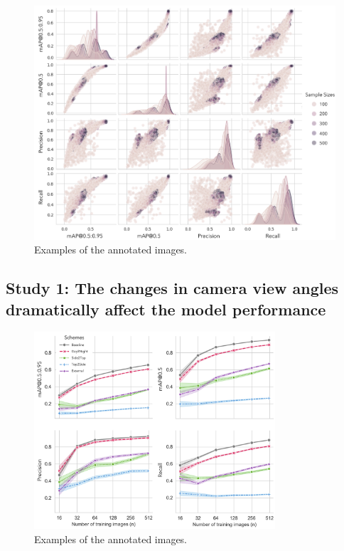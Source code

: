 \begin{figure}[H]
    \centering
    \includegraphics[width=1\textwidth]{figure_s1.jpg}
    \caption{Examples of the annotated images.}
    \label{fig:metrics}
\end{figure}



\subsection*{Study 1: The changes in camera view angles dramatically affect the model performance}


\begin{figure}[H]
    \centering
    \includegraphics[width=0.8\textwidth]{figure_3.jpg}
    \caption{Examples of the annotated images.}
    \label{fig:schemes}
\end{figure}

